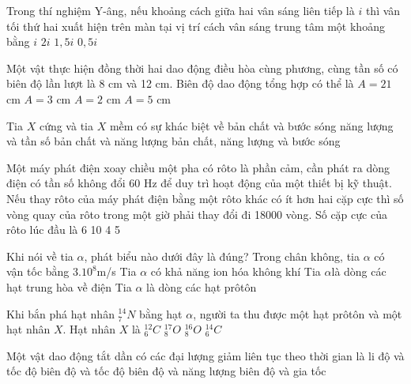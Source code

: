 \documentclass[11pt,a4paper]{book}
\begin{document}
								\begin{ex} 
									Trong thí nghiệm Y-âng, nếu khoảng cách giữa hai vân sáng liên tiếp là $i$ thì vân tối thứ hai xuất hiện trên màn tại vị trí cách vân sáng trung tâm một khoảng bằng
									\choice 
									{ $i$}
									{ $2i$}
									{ $1,5i$}
									{ $0,5i$} \end{ex} 
								\begin{ex} 
									Một vật thực hiện đồng thời hai dao động điều hòa cùng phương, cùng tần số có biên độ lần lượt là 8 cm và 12 cm. Biên độ dao động tổng hợp có thể là
									\choice 
									{ $A=21$ cm}
									{ $A=3$ cm}
									{ $A=2$ cm}
									{ $A=5$ cm
								} \end{ex} 
								\begin{ex} 
									Tia $X$ cứng và tia $X$ mềm có sự khác biệt về
									\choice 
									{ bản chất và bước sóng} 
									{ năng lượng và tần số} 
									{ bản chất và năng lượng} 
									{ bản chất, năng lượng và bước sóng} \end{ex} 
								\begin{ex} 
									Một máy phát điện xoay chiều một pha có rôto là phần cảm, cần phát ra dòng điện có tần số không đổi 60 Hz để duy trì hoạt động của một thiết bị kỹ thuật. Nếu thay rôto của máy phát điện bằng một rôto khác có ít hơn hai cặp cực thì số vòng quay của rôto trong một giờ phải thay đổi đi 18000 vòng. Số cặp cực của rôto lúc đầu là
									\choice 
									{ 6}
									{ 10}
									{ 4}
									{ 5} \end{ex} 
								\begin{ex} 
									Khi nói về tia $\alpha $, phát biểu nào dưới đây là đúng?
									\choice 
									{ Trong chân không, tia $\alpha $ có vận tốc bằng ${{3.10}^{8}}$m/s} 
									{ Tia $\alpha $ có khả năng ion hóa không khí} 
									{ Tia $\alpha $là dòng các hạt trung hòa về điện} 
									{ Tia $\alpha $ là dòng các hạt prôtôn} \end{ex} 
								\begin{ex} 
									Khi bắn phá hạt nhân ${}_{7}^{14}N$ bằng hạt $\alpha $, người ta thu được một hạt prôtôn và một hạt nhân $X$. Hạt nhân $X$ là
									\choice 
									{ ${}_{6}^{12}C$}
									{ ${}_{8}^{17}O$}
									{ ${}_{8}^{16}O$}
									{ ${}_{6}^{14}C$} \end{ex} 
								\begin{ex} 
									Một vật dao động tắt dần có các đại lượng giảm liên tục theo thời gian là
									\choice 
									{ li độ và tốc độ}
									{ biên độ và tốc độ} 
									{ biên độ và năng lượng}
									{ biên độ và gia tốc} \end{ex} 
\end{document}
